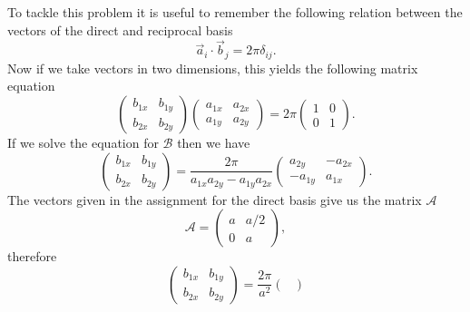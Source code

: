 \begin{questions}
\begin{solution}
  To tackle this problem it is useful to remember the following relation between the vectors of the direct and reciprocal basis
  \begin{equation}
    \vec{a}_i\cdot \vec{b}_j = 2\pi \delta_{ij}.
  \end{equation}
  Now if we take vectors in two dimensions, this yields the following matrix equation
  \begin{equation}
    \begin{pmatrix}
      b_{1x} & b_{1y}\\
      b_{2x} & b_{2y}
    \end{pmatrix}
    \begin{pmatrix}
      a_{1x} & a_{2x}\\
      a_{1y} & a_{2y}
    \end{pmatrix}
    = 2\pi \begin{pmatrix}
      1 &0\\
      0 & 1
    \end{pmatrix}.
  \end{equation}
  If we solve the equation for $\mathcal{B}$ then we have
  \begin{equation}
    \begin{pmatrix}
      b_{1x} & b_{1y}\\
      b_{2x} & b_{2y}
    \end{pmatrix}
    = \frac{2\pi}{a_{1x}a_{2y} - a_{1y}a_{2x}} \begin{pmatrix}
      a_{2y} & -a_{2x}\\
      -a_{1y} & a_{1x}
    \end{pmatrix}.
  \end{equation}
  The vectors given in the assignment for the direct basis give us the matrix $\mathcal{A}$
  \begin{equation}
    \mathcal{A}
    =  \begin{pmatrix}
      a & a/2\\
      0 & a
    \end{pmatrix},
  \end{equation}
  therefore
  \begin{equation}
    \begin{pmatrix}
      b_{1x} & b_{1y}\\
      b_{2x} & b_{2y}
    \end{pmatrix}
    = \frac{2\pi}{a^2} \begin{pmatrix}

\end{pmatrix}
\end{equation}
\end{solution}
\end{questions}
